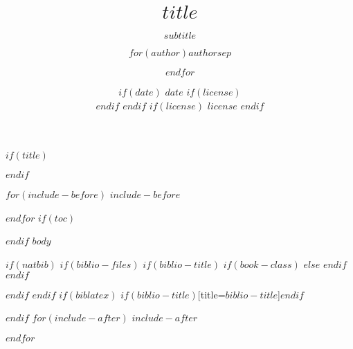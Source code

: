 \documentclass[$if(fontsize)$$fontsize$,$endif$$if(handout)$handout,$endif$$if(beamer)$ignorenonframetext,$endif$$for(classoption)$$classoption$$sep$,$endfor$]{$documentclass$}
\title[$short-title$]{$title$}
\subtitle{$subtitle$}
\author[
$if(short-author)$
$for(short-author)$$short-author$$sep$ \and $endfor$
$else$
$for(author)$$author$$sep$ \and $endfor$
$endif$
]{$for(author)$$author$$sep$ \and $endfor$}
\institute[
$if(short-institute)$
$for(short-institute)$$short-institute$$sep$ \and $endfor$
$endif$
]{
	$if(title-logo)$
	\texttt{[image: \$title-logo\$]}\\
	\vspace{2 mm}
	$endif$
	$if(department)$
	$for(department)$$department$$sep$ \and $endfor$ \\
	$endif$
	$for(institute)$$institute$$sep$ \and $endfor$
	$if(email)$
	\\ $for(email)$ \href{mailto:$email$}{\nolinkurl{$email$}}$sep$ \and $endfor$
	$endif$
}
\date[
$if(short-date)$
$short-date$
$else$
$date$
$endif$]{
	$if(date)$
	$date$
	$if(license)$
	\\ \vspace{5mm}
	$endif$
	$endif$
	$if(license)$
	{\scriptsize $license$}
	$endif$
}
\begin{document}
$if(title)$
\begin{frame}[plain]
\titlepage
\end{frame}
$endif$

$for(include-before)$
$include-before$

$endfor$
$if(toc)$
\begin{frame}
	\tableofcontents[hideallsubsections]
\end{frame}

$endif$
$body$

$if(natbib)$
$if(biblio-files)$
$if(biblio-title)$
$if(book-class)$
\renewcommand\bibname{$biblio-title$}
$else$
\renewcommand\refname{$biblio-title$}
$endif$
$endif$


$endif$
$endif$
$if(biblatex)$
\printbibliography$if(biblio-title)$[title=$biblio-title$]$endif$

$endif$
$for(include-after)$
$include-after$

$endfor$
\end{document}
